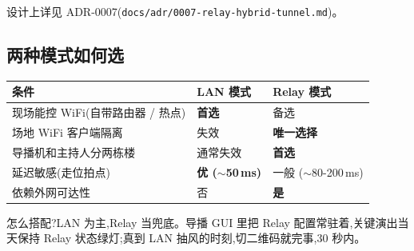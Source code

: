 设计上详见 ADR-0007(\texttt{docs/adr/0007-relay-hybrid-tunnel.md})。

\subsection{两种模式如何选}

\begin{center}\small
\begin{tabularx}{\linewidth}{l X X}
\toprule
\textbf{条件} & \textbf{LAN 模式} & \textbf{Relay 模式}\\
\midrule
现场能控 WiFi(自带路由器 / 热点) & \cellcolor{sdpanel}\bfseries 首选 & 备选 \\
场地 WiFi 客户端隔离 & 失效 & \cellcolor{sdpanel}\bfseries 唯一选择 \\
导播机和主持人分两栋楼 & 通常失效 & \cellcolor{sdpanel}\bfseries 首选 \\
延迟敏感(走位拍点) & \cellcolor{sdpanel}\bfseries 优 ($\sim$50\,ms) & 一般 ($\sim$80-200\,ms) \\
依赖外网可达性 & 否 & \cellcolor{sdred!10}\bfseries 是 \\
\bottomrule
\end{tabularx}
\end{center}

怎么搭配?LAN 为主,Relay 当兜底。导播 GUI 里把 Relay 配置常驻着,关键演出当天保持 Relay 状态绿灯;真到 LAN 抽风的时刻,切二维码就完事,30 秒内。
